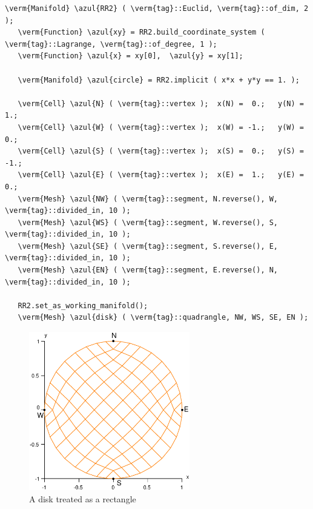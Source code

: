 \begin{Verbatim}[commandchars=\\\{\},formatcom=\small\tt,frame=single,
   label=main-\ref{\numb section 2.\numb parag 8}.cpp,rulecolor=\color{coment},
   baselinestretch=0.94,framesep=2mm]
   \verm{Manifold} \azul{RR2} ( \verm{tag}::Euclid, \verm{tag}::of_dim, 2 );
   \verm{Function} \azul{xy} = RR2.build_coordinate_system ( \verm{tag}::Lagrange, \verm{tag}::of_degree, 1 );
   \verm{Function} \azul{x} = xy[0],  \azul{y} = xy[1];
   
   \verm{Manifold} \azul{circle} = RR2.implicit ( x*x + y*y == 1. );
   
   \verm{Cell} \azul{N} ( \verm{tag}::vertex );  x(N) =  0.;   y(N) =  1.;
   \verm{Cell} \azul{W} ( \verm{tag}::vertex );  x(W) = -1.;   y(W) =  0.;
   \verm{Cell} \azul{S} ( \verm{tag}::vertex );  x(S) =  0.;   y(S) = -1.;
   \verm{Cell} \azul{E} ( \verm{tag}::vertex );  x(E) =  1.;   y(E) =  0.;
   \verm{Mesh} \azul{NW} ( \verm{tag}::segment, N.reverse(), W, \verm{tag}::divided_in, 10 );
   \verm{Mesh} \azul{WS} ( \verm{tag}::segment, W.reverse(), S, \verm{tag}::divided_in, 10 );
   \verm{Mesh} \azul{SE} ( \verm{tag}::segment, S.reverse(), E, \verm{tag}::divided_in, 10 );
   \verm{Mesh} \azul{EN} ( \verm{tag}::segment, E.reverse(), N, \verm{tag}::divided_in, 10 );
   
   RR2.set_as_working_manifold();
   \verm{Mesh} \azul{disk} ( \verm{tag}::quadrangle, NW, WS, SE, EN );
\end{Verbatim}

\begin{figure} \centering
  \includegraphics[width=70mm]{disk}
  \caption{A disk treated as a rectangle}
  \label{\numb section 2.\numb fig 8}
\end{figure}


